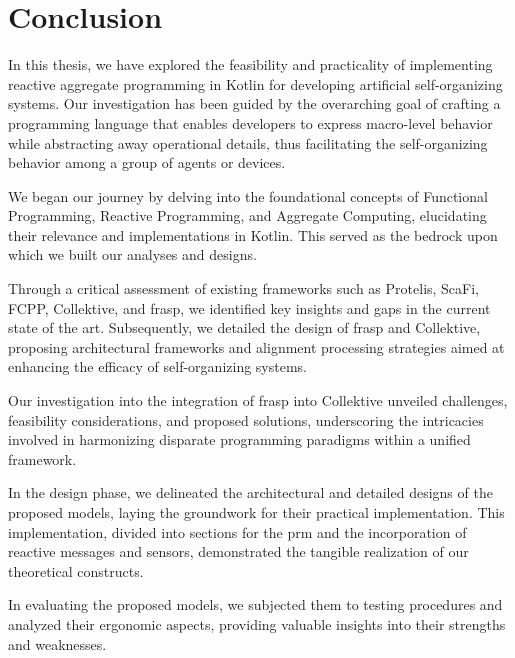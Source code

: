 
\chapter{Conclusion}
\label{chap:conclusion}

In this thesis, we have explored the feasibility and practicality of implementing reactive aggregate programming in Kotlin for developing artificial self-organizing systems. Our investigation has been guided by the overarching goal of crafting a programming language that enables developers to express macro-level behavior while abstracting away operational details, thus facilitating the self-organizing behavior among a group of agents or devices.

We began our journey by delving into the foundational concepts of Functional Programming, Reactive Programming, and Aggregate Computing, elucidating their relevance and implementations in Kotlin. This served as the bedrock upon which we built our analyses and designs.

Through a critical assessment of existing frameworks such as Protelis, ScaFi, FCPP, Collektive, and \ac{frasp}, we identified key insights and gaps in the current state of the art. Subsequently, we detailed the design of \ac{frasp} and Collektive, proposing architectural frameworks and alignment processing strategies aimed at enhancing the efficacy of self-organizing systems.

Our investigation into the integration of \ac{frasp} into Collektive unveiled challenges, feasibility considerations, and proposed solutions, underscoring the intricacies involved in harmonizing disparate programming paradigms within a unified framework.

In the design phase, we delineated the architectural and detailed designs of the proposed models, laying the groundwork for their practical implementation. This implementation, divided into sections for the \ac{prm} and the incorporation of reactive messages and sensors, demonstrated the tangible realization of our theoretical constructs.

In evaluating the proposed models, we subjected them to testing procedures and analyzed their ergonomic aspects, providing valuable insights into their strengths and weaknesses.

